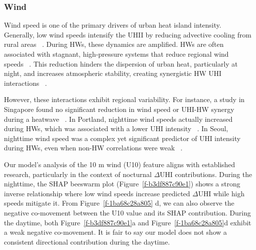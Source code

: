 \subsubsection*{Wind}Wind speed is one of the primary drivers of urban heat island intensity. Generally, low wind speeds intensify the UHII by reducing advective cooling from rural areas\unskip~\cite{2755510:33598893,2755510:33598924,2755510:33598926,2755510:33598952,2755510:33598927,2755510:33598930} . During HWs, these dynamics are amplified. HWs are often associated with stagnant, high-pressure systems that reduce regional wind speeds\unskip~\cite{2755510:33598926} . This reduction hinders the dispersion of urban heat, particularly at night, and increases atmospheric stability, creating synergistic HW UHI interactions\unskip~\cite{2755510:33598950,2755510:33598926,2755510:33598891,2755510:33598941,2755510:33598930} . 

However, these interactions exhibit regional variability. For instance, a study in Singapore found no significant reduction in wind speed or UHI-HW synergy during a heatwave\unskip~\cite{2755510:33598915} . In Portland, nighttime wind speeds actually increased during HWs, which was associated with a lower UHI intensity\unskip~\cite{2755510:33598921} . In Seoul, nighttime wind speed was a complex yet significant predictor of UHI intensity during HWs, even when non-HW correlations were weak\unskip~\cite{2755510:33598952} .

Our model's analysis of the 10 m wind (U10)  feature aligns with established research, particularly in the context of nocturnal \ensuremath{\Delta }UHI contributions. During the nighttime, the SHAP beeswarm plot (Figure~\ref{f-b3df887c90e1}) shows a strong inverse relationship where low wind speeds increase predicted \ensuremath{\Delta }UHI while high speeds mitigate it. From Figure~\ref{f-1ba68c28a805} d, we can also observe the negative co-movement between the U10 value and its SHAP contribution.  During the daytime,  both Figure~\ref{f-b3df887c90e1}a and Figure~\ref{f-1ba68c28a805}d exhibit a weak negative co-movement. It is fair to say our model does not show a consistent directional contribution during the daytime.





